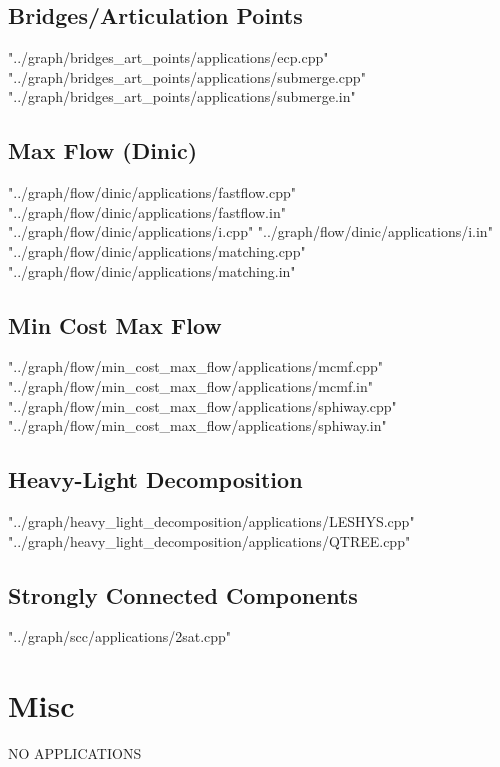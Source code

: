 \documentclass [12pt,onecolumn,oneside]{article}
\begin{document}
\subsection{ Bridges/Articulation Points}
 {"../graph/bridges_art_points/applications/ecp.cpp"}
 {"../graph/bridges_art_points/applications/submerge.cpp"}
 {"../graph/bridges_art_points/applications/submerge.in"}
\subsection{ Max Flow (Dinic)}
 {"../graph/flow/dinic/applications/fastflow.cpp"}
 {"../graph/flow/dinic/applications/fastflow.in"}
 {"../graph/flow/dinic/applications/i.cpp"}
 {"../graph/flow/dinic/applications/i.in"}
 {"../graph/flow/dinic/applications/matching.cpp"}
 {"../graph/flow/dinic/applications/matching.in"}
\subsection{ Min Cost Max Flow}
 {"../graph/flow/min_cost_max_flow/applications/mcmf.cpp"}
 {"../graph/flow/min_cost_max_flow/applications/mcmf.in"}
 {"../graph/flow/min_cost_max_flow/applications/sphiway.cpp"}
 {"../graph/flow/min_cost_max_flow/applications/sphiway.in"}
\subsection{ Heavy-Light Decomposition}
 {"../graph/heavy_light_decomposition/applications/LESHYS.cpp"}
 {"../graph/heavy_light_decomposition/applications/QTREE.cpp"}
\subsection{ Strongly Connected Components}
 {"../graph/scc/applications/2sat.cpp"}
\newpage

\section{Misc}
NO APPLICATIONS
\newpage
\end{document}
